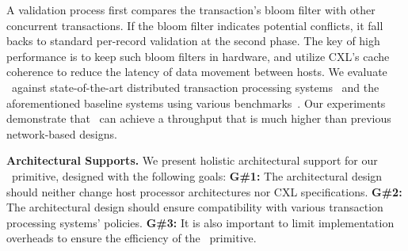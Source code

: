A validation process first compares the transaction's bloom filter with other concurrent transactions. If the bloom filter indicates potential conflicts, it fall backs to standard per-record validation at the second phase. 
The key of high performance is to keep such bloom filters in hardware, and utilize CXL's cache coherence to reduce the latency of data movement between hosts. 
We evaluate \name~against state-of-the-art distributed transaction processing systems~\cite{farm, drtm} and the aforementioned baseline systems using various benchmarks~\cite{}. Our experiments demonstrate that \name~can achieve a throughput that is much higher than previous network-based designs. 
\fi



\noindent \textbf{Architectural Supports.}
We present holistic architectural support for our \name~primitive, designed with the following goals:
\noindent \textbf{G\#1: }
The architectural design should neither change host processor architectures nor CXL specifications.
\noindent \textbf{G\#2: }
The architectural design should ensure compatibility with various transaction processing systems' policies.
\noindent \textbf{G\#3: }
It is also important to limit implementation overheads to ensure the efficiency of the \name~primitive.




